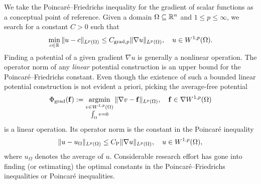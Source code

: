 \documentclass[a4paper]{amsart}
\begin{document}
We take the Poincar\'e--Friedrichs inequality for the gradient of scalar functions as a conceptual point of reference.
Given a domain $\Omega \subseteq {\mathbb R}^n$ and $1 \leq p \leq \infty$,
we search for a constant $C > 0$ such that 
\begin{align*}
    \min\limits_{c\in{\mathbb R}}
    \| u - c \|_{L^{p}(\Omega)}
    \leq 
    C_{\operatorname{grad},p} \| \nabla u \|_{L^p(\Omega)},
    \quad 
    u \in W^{1,p}(\Omega)
    .
\end{align*}
Finding a potential of a given gradient $\nabla u$ is generally a nonlinear operation. 
The operator norm of any \emph{linear} potential construction is an upper bound for the Poincar\'e--Friedrichs constant. 
Even though the existence of such a bounded linear potential construction is not evident a priori, 
picking the average-free potential 
\begin{align*}
    \Phi_{\operatorname{grad}}( {\mathbf f} ) 
    := 
    \operatorname*{{\rm argmin}}\limits_{ \substack{ v \in W^{1,p}(\Omega) \\ \int_\Omega v = 0 } } \| \nabla v - {\mathbf f} \|_{L^{p}(\Omega)},
    \quad 
    {\mathbf f} \in \nabla W^{1,p}(\Omega)
\end{align*}
is a linear operation. Its operator norm is the constant in the Poincar\'e inequality 
\begin{align*}
    \| u - u_{\Omega} \|_{L^{p}(\Omega)}
    \leq 
    C_{\rm P} \| \nabla u \|_{L^p(\Omega)},
    \quad 
    u \in W^{1,p}(\Omega)
    ,
\end{align*}
where $u_\Omega$ denotes the average of $u$.
Considerable research effort has gone into finding (or estimating) the optimal constants in the Poincar\'e--Friedrichs inequalities or Poincar\'e inequalities. 
\end{document}
